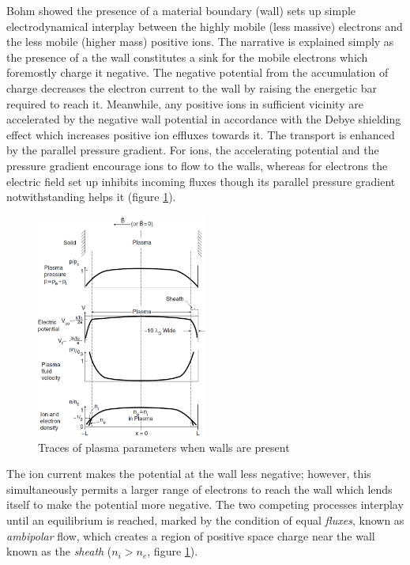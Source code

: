 \documentclass[11pt,titlepage]{report}
\begin{document}
Bohm showed the presence of a material boundary (wall) sets up simple electrodynamical interplay between the highly mobile (less massive) electrons and the less mobile (higher mass) positive ions. The narrative is explained simply as the presence of a the wall constitutes a sink for the mobile electrons which foremostly charge it negative. The negative potential from the accumulation of charge decreases the electron current to the wall by raising the energetic bar required to reach it. Meanwhile, any positive ions in sufficient vicinity are accelerated by the negative wall potential in accordance with the Debye shielding effect which increases positive ion effluxes towards it. The transport is enhanced by the parallel pressure gradient. For ions, the accelerating potential and the pressure gradient encourage ions to flow to the walls, whereas for electrons the electric field set up inhibits incoming fluxes though its parallel pressure gradient notwithstanding helps it (figure \ref{fig:Stangeby_1Dplasma_params_edge}). 


\begin{figure}[h!]
  \centering
    \includegraphics[width=0.5\textwidth]{graphics/Stangeby_1Dplasma_params_edge}
  \caption{Traces of plasma parameters when walls are present}
  \label{fig:Stangeby_1Dplasma_params_edge}
\end{figure}

The ion current makes the potential at the wall less negative; however, this simultaneously permits a larger range of electrons to reach the wall which lends itself to make the potential more negative. The two competing processes interplay until an equilibrium is reached, marked by the condition of equal \emph{fluxes}, known as \emph{ambipolar} flow, which creates a region of positive space charge near the wall known as the \emph{sheath} ($n_i > n_e$, figure \ref{fig:Stangeby_1Dplasma_params_edge}). 
\end{document}
